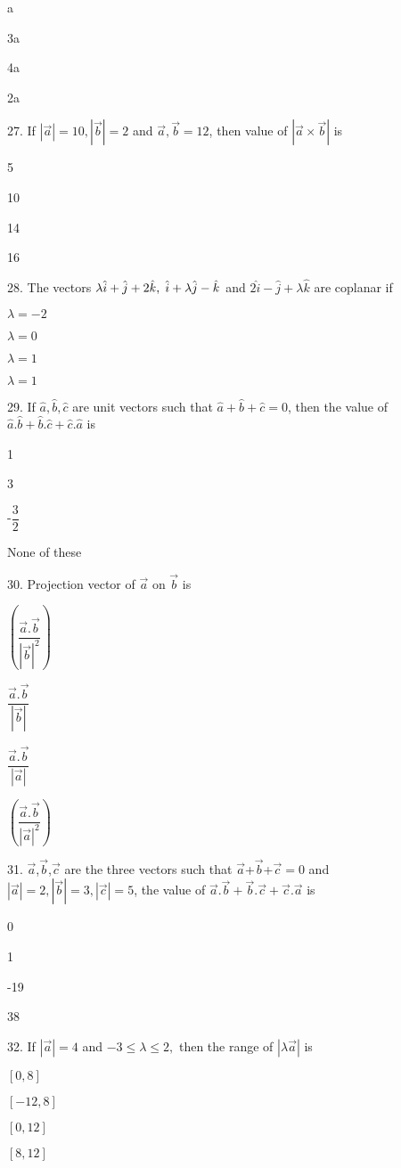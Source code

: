 \documentclass{article}
\newcommand{\choice}{\item}
\begin{document}
\begin{choices}[fourcol]
\choice a
\choice 3a
\choice 4a
\choice 2a
\end{choices}
27. If $|\overrightarrow{a}|=10, |\overrightarrow{b}|=2$ and $\overrightarrow{a},\overrightarrow{b}=12$, then value of $|\overrightarrow{a}\times\overrightarrow{b}|$ is
\begin{choices}[fourcol]
\choice 5
\choice 10
\choice 14
\choice 16
\end{choices}
28. The vectors $\lambda\hat{i}+\hat{j}+2\hat{k},\hspace{1mm} \hat{i}+\lambda\hat{j}-\hat{k}$ and $2\hat{i}-\hat{j}+\lambda\hat{k}$ are coplanar if
\begin{choices}[fourcol]
\choice $\lambda=-2$
\choice $\lambda=0$
\choice $\lambda=1$
\choice $\lambda=1$
\end{choices}
29. If $\hat{a},\hat{b},\hat{c}$ are unit vectors such that $\hat{a}+\hat{b}+\hat{c}=0$, then the value of $\hat{a}.\hat{b}+\hat{b}.\hat{c}+\hat{c}.\hat{a}$ is
\begin{choices}[fourcol]
\choice 1
\choice 3
\choice -$\dfrac{3}{2}$
\choice None of these
\end{choices}
30. Projection vector of $\overrightarrow{a}$ on $\overrightarrow{b}$ is
\begin{choices}[fourcol]
\choice $\left(\dfrac{\overrightarrow{a}.\overrightarrow{b}}{|\overrightarrow{b}|^2}\right)$
\choice $\dfrac{\overrightarrow{a}.\overrightarrow{b}}{|\overrightarrow{b}|}$
\choice $\dfrac{\overrightarrow{a}.\overrightarrow{b}}{|\overrightarrow{a}|}$
\choice $\left(\dfrac{\overrightarrow{a}.\overrightarrow{b}}{|\overrightarrow{a}|^2}\right)$
\end{choices}
31. $\overrightarrow{a}$,$\overrightarrow{b}$,$\overrightarrow{c}$ are the three vectors such that $\overrightarrow{a}$+$\overrightarrow{b}$+$\overrightarrow{c}=0$ and $|\overrightarrow{a}|=2, |\overrightarrow{b}|=3, |\overrightarrow{c}|=5$, the value of $\overrightarrow{a}.\overrightarrow{b}+\overrightarrow{b}.\overrightarrow{c}+\overrightarrow{c}.\overrightarrow{a}$ is
\begin{choices}[fourcol]
\choice 0
\choice 1
\choice -19
\choice 38
\end{choices}
32. If $|\overrightarrow{a}|=4$ and $-3\leq\lambda\leq2,$ then the range of $|\lambda\overrightarrow{a}|$ is
\begin{choices}[fourcol]
\choice $\left[0,8\right]$
\choice $\left[-12,8\right]$
\choice $\left[0,12\right]$
\choice $\left[8,12\right]$
\end{choices}
\end{document}
